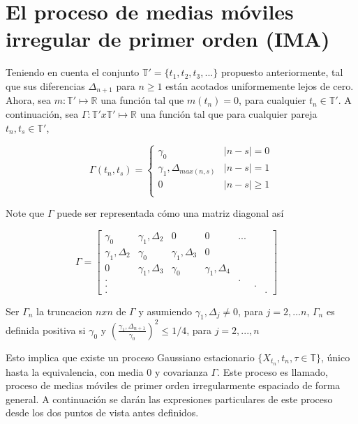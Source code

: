 \section{El proceso de medias móviles irregular de primer orden (IMA)}
Teniendo en cuenta el conjunto $\mathbb{T}'= \lbrace t_1,t_2, t_3,... \rbrace$ propuesto anteriormente, 
tal que sus diferencias $\Delta_{n+1}$ para $n\geq 1$ están acotados uniformemente lejos de cero. Ahora, 
sea $m: \mathbb{T}' \mapsto \mathbb{R} $ una función tal que $m(t_n)=0$, para cualquier $t_n \in \mathbb{T}'$. 
A continuación, sea $\Gamma: \mathbb{T}'x\mathbb{T}' \mapsto \mathbb{R}$ una función tal que para cualquier 
pareja $t_n,t_s \in \mathbb{T}'$,

\begin{equation*}
\Gamma (t_n,t_s)=
    \begin{cases}
    \gamma_0& |n-s|=0\\
    \gamma_1,\Delta_{max(n,s)} & |n-s|=1\\
    0 & |n-s|\geq1\\
    \end{cases}
\end{equation*}

Note que $\Gamma$ puede ser representada cómo una matriz diagonal así

\begin{equation}
    \Gamma=
	\begin{bmatrix} 
	\gamma_0 & \gamma_1,\Delta_2 & 0 & 0 & ... \\
	\gamma_1,\Delta_2 & \gamma_0 & \gamma_1,\Delta_3 & 0\\
	0 & \gamma_1,\Delta_3 & \gamma_0 & \gamma_1,\Delta_4 \\
	.& & & & . \\
	.& & & & & .\\
	. & & & & & & .
	\end{bmatrix}
	\quad
	\label{mat1}
\end{equation}

Ser $\Gamma_n$ la truncacion $nxn$ de $\Gamma$ y asumiendo $\gamma_1,\Delta_j\neq 0$, para $j=2,...n$, $\Gamma_n$ 
es definida positiva si $\gamma_0$ y $(\frac{\gamma_1,\Delta_{n+1}}{\gamma_0})^2 \leq 1/4$, para $j=2,...,n$

Esto implica que existe un proceso Gaussiano estacionario $\lbrace X_{t_n},t_n, \tau \in \mathbb{T}\rbrace$, 
único hasta la equivalencia, con media 0 y covarianza $\Gamma$. Este proceso es llamado, proceso de medias móviles
 de primer orden irregularmente espaciado de forma general. A continuación se darán las expresiones particulares 
 de este proceso desde los dos puntos de vista antes definidos.

